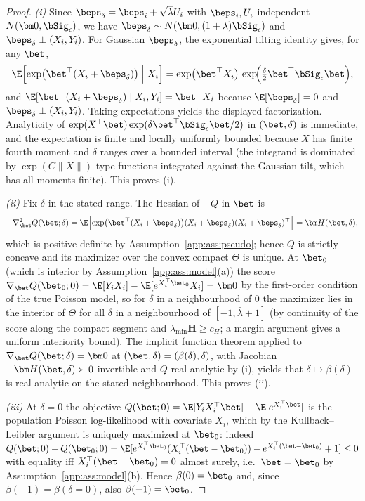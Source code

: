 \begin{proof}
\emph{(i)} Since $\beps_\delta=\beps_i+\sqrt\lambda U_i$ with
$\beps_i,U_i$ independent $N(\bm 0,\bSig_\epsilon)$, we have
$\beps_\delta\sim N(\bm 0,(1+\lambda)\bSig_\epsilon)$ and
$\beps_\delta\perp(X_i,Y_i)$. For Gaussian $\beps_\delta$, the exponential
tilting identity gives, for any $\bet$,
\[
  \E\Bigl[\exp\bigl(\bet^\top(X_i+\beps_\delta)\bigr)\Bigm|X_i\Bigr]
  =\exp\bigl(\bet^\top X_i\bigr)\,
   \exp\!\Bigl(\tfrac{\delta}{2}\bet^\top\bSig_\epsilon\bet\Bigr),
\]
and $\E[\bet^\top(X_i+\beps_\delta)\mid X_i,Y_i]=\bet^\top X_i$ because
$\E[\beps_\delta]=0$ and $\beps_\delta\perp(X_i,Y_i)$. Taking expectations
yields the displayed factorization. Analyticity of
$\exp(X^\top\bet)\exp(\delta\bet^\top\bSig_\epsilon\bet/2)$ in
$(\bet,\delta)$ is immediate, and the expectation is finite and
locally uniformly bounded because $X$ has finite fourth moment and
$\delta$ ranges over a bounded interval (the integrand is dominated by
$\exp(C\|X\|)$-type functions integrated against the Gaussian tilt, which
has all moments finite). This proves (i).

\emph{(ii)} Fix $\delta$ in the stated range. The Hessian of $-Q$ in
$\bet$ is
\[
  -\nabla_{\bet}^2Q(\bet;\delta)
  =\E\Bigl[\exp\bigl(\bet^\top(X_i+\beps_\delta)\bigr)
   (X_i+\beps_\delta)(X_i+\beps_\delta)^\top\Bigr]
  =\bm H(\bet,\delta),
\]
which is positive definite by Assumption~\ref{app:ass:pseudo}; hence $Q$ is
strictly concave and its maximizer over the convex compact $\Theta$ is
unique. At $\bet_0$ (which is interior by Assumption~\ref{app:ass:model}(a))
the score
$\nabla_{\bet} Q(\bet_0;0)=\E[Y_iX_i]-\E[e^{X_i^\top\bet_0}X_i]=\bm 0$
by the first-order condition of the true Poisson model, so for $\delta$
in a neighbourhood of $0$ the maximizer lies in the interior of $\Theta$
for all $\delta$ in a neighbourhood of $[-1,\bar\lambda+1]$
(by continuity of the score along the compact segment and
$\lambda_{\min}\bm H\ge c_H$; a margin argument gives a uniform interiority
bound). The implicit function theorem applied to
$\nabla_{\bet} Q(\bet;\delta)=\bm 0$ at $(\bet,\delta)=(\beta(\delta),\delta)$,
with Jacobian $-\bm H(\bet,\delta)\succ 0$ invertible and
$Q$ real-analytic by (i), yields that $\delta\mapsto\beta(\delta)$ is
real-analytic on the stated neighbourhood. This proves (ii).

\emph{(iii)} At $\delta=0$ the objective
$Q(\bet;0)=\E[Y_iX_i^\top\bet]-\E[e^{X_i^\top\bet}]$ is the population
Poisson log-likelihood with covariate $X_i$, which by the Kullback--Leibler
argument is uniquely maximized at $\bet_0$: indeed
$Q(\bet;0)-Q(\bet_0;0)=\E[e^{X_i^\top\bet_0}(X_i^\top(\bet-\bet_0))
- e^{X_i^\top(\bet-\bet_0)}+1]\le 0$ with equality iff
$X_i^\top(\bet-\bet_0)=0$ almost surely, i.e.\ $\bet=\bet_0$ by
Assumption~\ref{app:ass:model}(b). Hence $\beta(0)=\bet_0$ and, since
$\beta(-1)=\beta(\delta=0)$, also $\beta(-1)=\bet_0$.


\end{proof}
